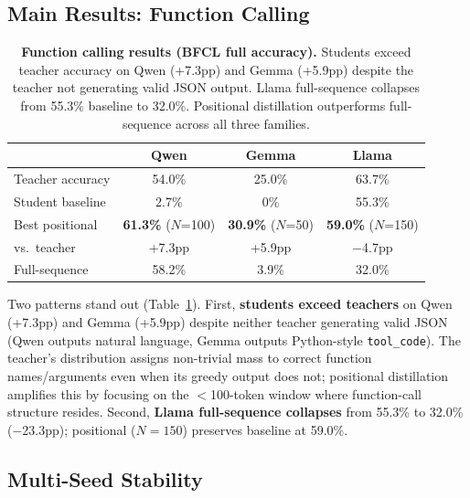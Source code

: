 \documentclass[10pt]{article}
\begin{document}
\subsection{Main Results: Function Calling}
\label{sec:funcall_results}

\begin{table}[t]
\centering
\caption{\textbf{Function calling results (BFCL full accuracy).} Students exceed teacher accuracy on Qwen (+7.3pp) and Gemma (+5.9pp) despite the teacher not generating valid JSON output. Llama full-sequence collapses from 55.3\% baseline to 32.0\%. Positional distillation outperforms full-sequence across all three families.}
\label{tab:funcall}
\small
\begin{tabular}{@{}lccc@{}}
\toprule
& \textbf{Qwen} & \textbf{Gemma} & \textbf{Llama} \\
\midrule
Teacher accuracy & 54.0\% & 25.0\% & 63.7\% \\
Student baseline & 2.7\% & 0\% & 55.3\% \\
\midrule
Best positional  & \textbf{61.3\%} ($N$=100) & \textbf{30.9\%} ($N$=50) & \textbf{59.0\%} ($N$=150) \\
\quad vs.\ teacher & {\color{green!50!black}+7.3pp} & {\color{green!50!black}+5.9pp} & $-$4.7pp \\
Full-sequence    & 58.2\% & 3.9\% & 32.0\% \\
\bottomrule
\end{tabular}
\end{table}

Two patterns stand out (Table~\ref{tab:funcall}).
First, \textbf{students exceed teachers} on Qwen (+7.3pp) and Gemma (+5.9pp) despite neither teacher generating valid JSON (Qwen outputs natural language, Gemma outputs Python-style \texttt{tool\_code}). The teacher's distribution assigns non-trivial mass to correct function names/arguments even when its greedy output does not; positional distillation amplifies this by focusing on the $<$100-token window where function-call structure resides.
Second, \textbf{Llama full-sequence collapses} from 55.3\% to 32.0\% ($-$23.3pp); positional ($N{=}150$) preserves baseline at 59.0\%.

\subsection{Multi-Seed Stability}
\label{sec:multiseed}
\end{document}
